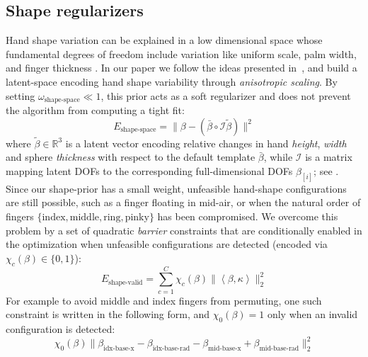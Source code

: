 \subsection{Shape regularizers}
\label{sec:shapeprior}
Hand shape variation can be explained in a low dimensional space whose fundamental degrees of freedom include variation like uniform scale, palm width, and finger thickness \cite{khamis2015learning}. In our paper we follow the ideas presented in~\cite{edoardo}, and build a latent-space encoding hand shape variability through \emph{anisotropic scaling}. By setting $\omega_\text{shape-space}{\ll}1$,
this prior acts as a soft regularizer and does not prevent the algorithm from computing a tight fit:
% 
\begin{equation}
E_\text{shape-space} = \|\beta - (\bar{\beta} \circ \mathcal{I}\tilde{\beta}) \|^2
\label{eq:shapespace}
\end{equation}
% 
where $\tilde\beta \in \mathbb{R}^3$ is a latent vector encoding relative changes in hand \emph{height}, \emph{width} and sphere \emph{thickness} with respect to the default template $\bar\beta$, while $\mathcal{I}$ is a matrix mapping latent DOFs to the corresponding full-dimensional DOFs $\beta_{[i]}$; see . 
% 
Since our shape-prior has a small weight, unfeasible hand-shape configurations are still possible, such as a finger floating in mid-air, or when the natural order of fingers $\{\text{index},\text{middle},\text{ring},\text{pinky}\}$ has been compromised. 
We overcome this problem by a set of quadratic \emph{barrier} constraints that are conditionally enabled in the optimization when unfeasible configurations are detected (encoded via $\chi_c(\beta) \in \{ 0,1 \}$):
% 
\begin{equation}
E_\text{shape-valid} = \sum_{c=1}^C \chi_c(\beta) \| \left< \beta, \kappa \right> \|_2^2
\label{eq:valideshape}
\end{equation}
% 
For example to avoid middle and index fingers from permuting, one such constraint is written in the following form, and $\chi_0(\beta)=1$ only when an invalid configuration is detected:
% 
\begin{equation*}
\chi_0(\beta) \| \beta_\text{idx-base-x} - \beta_\text{idx-base-rad} - \beta_\text{mid-base-x} + \beta_\text{mid-base-rad} \|_2^2
\end{equation*}
